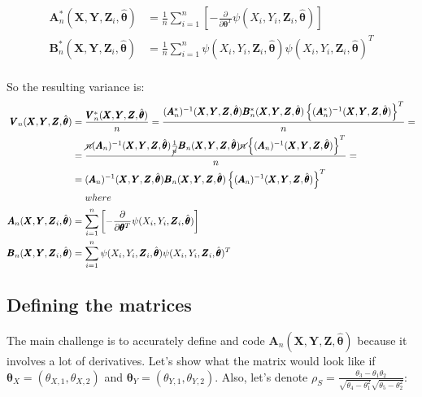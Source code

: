 \documentclass[]{article}
\begin{document}
	
	$$
	\begin{aligned}
		\pmb{A}^*_n(\pmb{X}, \pmb{Y}, \pmb{Z}_i, \hat{\pmb{\theta}}) &= \frac{1}{n} \sum_{i = 1}^{n}\left[ -\frac{\partial}{\partial \pmb{\theta}^T}\psi(X_i, Y_i, \pmb{Z}_i, \hat{\pmb{\theta}}) \right]\\
		\pmb{B}^*_n(\pmb{X}, \pmb{Y}, \pmb{Z}_i, \hat{\pmb{\theta}}) &= \frac{1}{n} \sum_{i = 1}^{n} \psi(X_i, Y_i, \pmb{Z}_i, \hat{\pmb{\theta}}) \psi(X_i, Y_i, \pmb{Z}_i, \hat{\pmb{\theta}})^T\\
 	\end{aligned}
	$$

So the resulting variance is:
	$$
	\begin{aligned}
		\pmb{V}_n(\pmb{X}, \pmb{Y}, \pmb{Z}, \hat{\pmb{\theta}}) &= \frac{\pmb{V}^*_n(\pmb{X}, \pmb{Y}, \pmb{Z}, \hat{\pmb{\theta}})}{n} = \frac{(\pmb{A}_n^*)^{-1}(\pmb{X}, \pmb{Y}, \pmb{Z}, \hat{\pmb{\theta}}) \pmb{B}^*_n(\pmb{X}, \pmb{Y}, \pmb{Z}, \hat{\pmb{\theta}})  \left\{(\pmb{A}_n^*)^{-1}(\pmb{X}, \pmb{Y}, \pmb{Z}, \hat{\pmb{\theta}}) \right\}^T}{n} = \\
    &=\frac{\cancel{n}(\pmb{A}_n)^{-1}(\pmb{X}, \pmb{Y}, \pmb{Z}, \hat{\pmb{\theta}})\frac{1}{\cancel{n}} \pmb{B}_n(\pmb{X}, \pmb{Y}, \pmb{Z}, \hat{\pmb{\theta}})  \cancel{n}\left\{(\pmb{A}_n)^{-1}(\pmb{X}, \pmb{Y}, \pmb{Z}, \hat{\pmb{\theta}}) \right\}^T}{n} = \\
    &=(\pmb{A}_n)^{-1}(\pmb{X}, \pmb{Y}, \pmb{Z}, \hat{\pmb{\theta}}) \pmb{B}_n(\pmb{X}, \pmb{Y}, \pmb{Z}, \hat{\pmb{\theta}})  \left\{(\pmb{A}_n)^{-1}(\pmb{X}, \pmb{Y}, \pmb{Z}, \hat{\pmb{\theta}}) \right\}^T\\
    &~~~~where\\
		\pmb{A}_n(\pmb{X}, \pmb{Y}, \pmb{Z}_i, \hat{\pmb{\theta}}) &=  \sum_{i = 1}^{n}\left[ -\frac{\partial}{\partial \pmb{\theta}^T}\psi(X_i, Y_i, \pmb{Z}_i, \hat{\pmb{\theta}}) \right]\\
		\pmb{B}_n(\pmb{X}, \pmb{Y}, \pmb{Z}_i, \hat{\pmb{\theta}}) &=  \sum_{i = 1}^{n} \psi(X_i, Y_i, \pmb{Z}_i, \hat{\pmb{\theta}}) \psi(X_i, Y_i, \pmb{Z}_i, \hat{\pmb{\theta}})^T\\
 	\end{aligned}
	$$

\subsection{Defining the matrices}
\label{Defining:Matr}

The main challenge is to accurately define and code $\pmb{A}_n(\pmb{X}, \pmb{Y}, \pmb{Z}, \hat{\pmb{\theta}})$ because it involves a lot of derivatives. Let's show what the matrix would look like if $\pmb{\theta}_X = (\theta_{X, 1}, \theta_{X, 2})$ and $\pmb{\theta}_Y= (\theta_{Y, 1}, \theta_{Y, 2})$. Also, let's denote $\rho_S = \frac{\theta_3 - \theta_1\theta_2}{\sqrt{\theta_4 - \theta_1^2}\sqrt{\theta_5 - \theta_2^2}}$:
\end{document}
